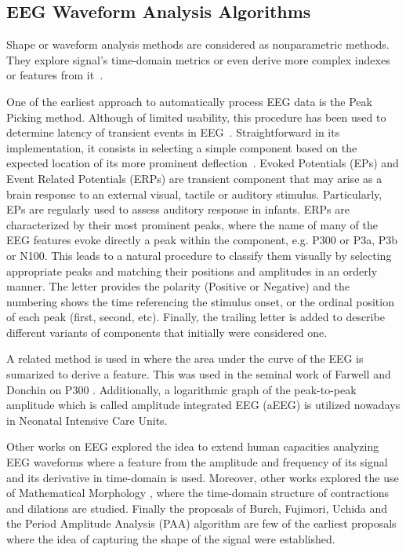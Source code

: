 
\subsection{EEG Waveform Analysis Algorithms}
\label{waveformalgorithms}

Shape or waveform analysis methods are considered as nonparametric methods.  They explore signal's time-domain metrics or even derive more complex indexes or features from it~\cite{Thakor2009}. 

One of the earliest approach to automatically process EEG data is the Peak Picking method.  Although of limited usability, this procedure has been used to determine latency of transient events in EEG~\cite{Jaskowski2000,Zhang2011}.  Straightforward in its implementation, it consists in selecting a simple component based on the expected location of its more prominent deflection~\cite{Ouyang2017}.  Evoked Potentials (EPs) and Event Related Potentials (ERPs) are transient component that may arise as a brain response to an external visual, tactile or auditory stimulus.  Particularly, EPs are regularly used to assess auditory response in infants. ERPs are characterized by their most prominent peaks, where the name of many of the EEG features evoke directly a peak within the component, e.g. P300 or P3a, P3b or N100.  This leads to a natural procedure to classify them visually by selecting appropriate peaks and matching their positions and amplitudes in an orderly manner.  The letter provides the polarity (Positive or Negative) and the numbering shows the time referencing the stimulus onset, or the ordinal position of each peak (first, second, etc).   Finally, the trailing letter is added to describe different variants of components that initially were considered one.

A related method is used in \cite{Alvarado-Gonzalez2016} where the area under the curve of the EEG is sumarized to derive a feature.  This was used in the seminal work of Farwell and Donchin on P300 \cite{Farwell1988,WolpawJonathanR2012}. Additionally, a logarithmic graph of the peak-to-peak amplitude which is called amplitude integrated EEG (aEEG) \cite{Shah2015} is utilized nowadays in Neonatal Intensive Care Units.

Other works on EEG explored the idea to extend human capacities analyzing EEG waveforms \cite{Klein1976} where a feature from the amplitude and frequency of its signal and its derivative in time-domain is used.  Moreover, other works explored the use of Mathematical Morphology \cite{Yamaguchi2009}, where the time-domain structure of contractions and dilations are studied. Finally the proposals of Burch, Fujimori, Uchida and the Period Amplitude Analysis (PAA) \cite{Uchida1996} algorithm are few of the earliest proposals where the idea of capturing the shape of the signal were established.

